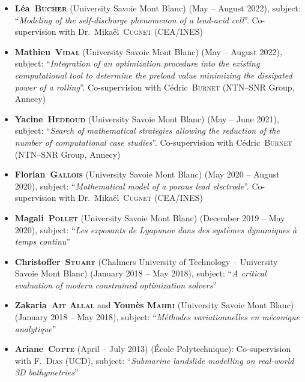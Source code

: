 \documentclass[final, a4paper, oneside, 12pt]{article}
\numberwithin{equation}{section}
\begin{document}
\begin{itemize}

  \item \textbf{L\'ea~\textsc{Bucher}} (University Savoie Mont Blanc) (May -- August 2022), subject: ``\textit{Modeling of the self-discharge phenomenon of a lead-acid cell}''. Co-supervision with Dr.~Mika\"el~\textsc{Cugnet} (CEA/INES)
  
  \item \textbf{Mathieu~\textsc{Vidal}} (University Savoie Mont Blanc) (May -- August 2022), subject: ``\textit{Integration of an optimization procedure into the existing computational tool to determine the preload value minimizing the dissipated power of a rolling}''. Co-supervision with C\'edric~\textsc{Burnet} (NTN--SNR Group, Annecy)

  \item \textbf{Yacine~\textsc{Hedeoud}} (University Savoie Mont Blanc) (May -- June 2021), subject: ``\textit{Search of mathematical strategies allowing the reduction of the number of computational case studies}''. Co-supervision with C\'edric~\textsc{Burnet} (NTN--SNR Group, Annecy)

  \item \textbf{Florian~\textsc{Gallois}} (University Savoie Mont Blanc) (May 2020 -- August 2020), subject: ``\textit{Mathematical model of a porous lead electrode}''. Co-supervision with Dr.~Mika\"el~\textsc{Cugnet} (CEA/INES)

  \item \textbf{Magali~\textsc{Pollet}} (University Savoie Mont Blanc) (December 2019 -- May 2020), subject: ``\textit{Les exposants de Lyapunov dans des syst\`emes dynamiques \`a temps continu}''

  \item \textbf{Christoffer~\textsc{Stuart}} (Chalmers University of Technology -- University Savoie Mont Blanc) (January 2018 -- May 2018), subject: ``\textit{A critical evaluation of modern constrained optimization solvers}''
  
  \item \textbf{Zakaria~\textsc{Ait Allal}} and \textbf{Youn\`es \textsc{Mahri}} (University Savoie Mont Blanc) (January 2018 -- May 2018), subject: ``\textit{M\'ethodes variationnelles en m\'ecanique analytique}''

  \item \textbf{Ariane~\textsc{Cotte}} (April -- July 2013) (\'Ecole Polytechnique): Co-supervision with F.~\textsc{Dias} (UCD), subject: ``\textit{Submarine landslide modelling on real-world 3D bathymetries}''
  

\end{itemize}
\end{document}
